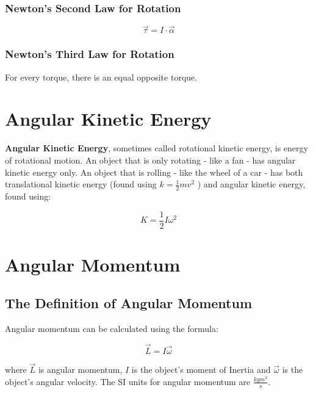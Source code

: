 	\subsubsection{Newton's Second Law for Rotation}
			\begin{mdframed}[backgroundcolor=orange!20!white]
		\begin{equation}
			\vec{\tau} = I \cdot \vec{\alpha}
			\label{equation:newtonssecondrotational}
		\end{equation}
	\end{mdframed}
	
	\subsubsection{Newton's Third Law for Rotation}
	For every torque, there is an equal opposite torque.
	
	
	\section{Angular Kinetic Energy}
	
	\textbf{Angular Kinetic Energy}, sometimes called rotational kinetic energy, is energy of rotational motion.  An object that is only rotating - like a fan - has angular kinetic energy only.  An object that is rolling - like the wheel of a car - has both translational kinetic energy (found using $k = \frac{1}{2}mv^2$ ) and angular kinetic energy, found using:
	
				\begin{mdframed}[backgroundcolor=orange!20!white]
		\begin{equation}
			K = \frac{1}{2}I\omega^2
			\label{equation:rotationalkineticenergy}
		\end{equation}
	\end{mdframed}
	
	\newpage
	\section{Angular Momentum} \label{angularmomentum} 
	\subsection{The Definition of Angular Momentum}
	Angular momentum can be calculated using the formula: 
	 	\begin{mdframed}[backgroundcolor=orange!20!white]
		\begin{equation}
		\vec{L} = I \vec{\omega}
		\label{equation:angularmomentum}
				\end{equation}
	\end{mdframed}
where $\vec{L}$ is angular momentum, $I$ is the object's moment of Inertia and $\vec{\omega}$ is the object's angular velocity.  The SI units for angular momentum are  $\frac{kg m^2} {s} $.


